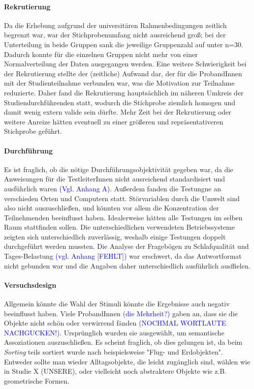 \paragraph{Rekrutierung}
Da die Erhebung aufgrund der universitären Rahmenbedingungen zeitlich begrenzt war, war der Stichprobenumfang nicht ausreichend groß; bei der Unterteilung in beide Gruppen sank die jeweilige Gruppenzahl auf unter n=30. Dadurch konnte für die einzelnen Gruppen nicht mehr von einer Normalverteilung der Daten ausgegangen werden. Eine weitere Schwierigkeit bei der Rekrutierung stellte der (zeitliche) Aufwand dar, der für die ProbandInnen mit der Studienteilnahme verbunden war, was die Motivation zur Teilnahme reduzierte. Daher fand die Rekrutierung hauptsächlich im näheren Umkreis der Studiendurchführenden statt, wodurch die Stichprobe ziemlich homogen und damit wenig extern valide sein dürfte. Mehr Zeit bei der Rekrutierung oder weitere Anreize hätten eventuell zu einer größeren und repräsentativeren Stichprobe geführt.

\paragraph{Durchführung}
Es ist fraglich, ob die nötige Durchführungsobjektivität gegeben war, da die Anweisungen für die TestleiterInnen nicht ausreichend standardisiert und ausführlich waren \textcolor{blue}{(Vgl. Anhang A)}. Außerdem fanden die Testungne an verschieden Orten und Computern statt. Störvariablen durch die Umwelt sind also nicht auszuschließen, und könnten vor allem die Konzentration der Teilnehmenden beeinflusst haben. Idealerweise hätten alle Testungen im selben Raum stattfinden sollen. Die unterschiedlichen verwendeten Betriebssysteme zeigten sich unterschiedlich zuverlässig, weshalb einige Testungen doppelt durchgeführt werden mussten.
Die Analyse der Fragebögen zu Schlafqualität und Tages-Belastung \textcolor{blue}{(vgl. Anhang [FEHLT])} war erschwert, da das Antwortformat nicht gebunden war und die Angaben daher unterschiedlich ausführlich ausffielen.

\paragraph{Versuchsdesign}
Allgemein könnte die Wahl der Stimuli könnte die Ergebnisse auch negativ beeinflusst haben.
 Viele ProbandInnen \textcolor{blue}{(die Mehrheit?)} gaben an, dass sie die Objekte nicht schön oder verwirrend fänden \textcolor{blue}{(NOCHMAL WORTLAUTE NACHGUCKEN!)}. Ursprünglich wurden sie ausgewählt, um semantische Assoziationen auszuschließen. Es scheint fraglich, ob dies gelungen ist, da beim \textit{Sorting} teils sortiert wurde nach beispielsweise "Flug- und Erdobjekten".
 Entweder sollte man wieder Alltagsobjekte, die leicht zugänglich sind, wählen wie in Studie X (UNSERE), oder vielleicht noch abstraktere Objekte wie z.B. geometrische Formen.

